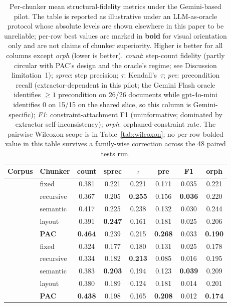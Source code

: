 \documentclass[make,article,submit,oneauthor,pdftex]{Definitions/mdpi}
\begin{document}
\begin{table}[ht]
\centering
\caption{Per-chunker mean structural-fidelity metrics under the
Gemini-based pilot. The table is reported as illustrative under an
LLM-as-oracle protocol whose absolute levels are shown elsewhere in
this paper to be unreliable; per-row best values are marked in
\textbf{bold} for visual orientation only and are not claims of
chunker superiority. Higher is better for all columns except
\emph{orph} (lower is better). \emph{count}: step-count fidelity
(partly circular with PAC's design and the oracle's regime; see
Discussion limitation~1); \emph{sprec}: step precision; $\tau$:
Kendall's~$\tau$; \emph{pre}: precondition recall (extractor-dependent
in this pilot; the Gemini Flash oracle identifies $\geq 1$ precondition
on 26/26 documents while gpt-4o-mini identifies $0$ on 15/15 on the
shared slice, so this column is Gemini-specific);
\emph{F1}: constraint-attachment F1 (uninformative; dominated by
extractor self-inconsistency);
\emph{orph}: orphaned-constraint rate. The pairwise Wilcoxon scope is
in Table~\ref{tab:wilcoxon}; no per-row bolded value in this table
survives a family-wise correction across the 48 paired tests run.}
\label{tab:headline}
\begin{tabular}{llcccccc}
\toprule
Corpus & Chunker & count & sprec & $\tau$ & pre & F1 & orph \\
\midrule
{}
 & fixed        & 0.381 & 0.221 & 0.221 & 0.171 & 0.035 & 0.221 \\
 & recursive    & 0.367 & 0.205 & \textbf{0.255} & 0.156 & \textbf{0.036} & 0.220 \\
 & semantic     & 0.417 & 0.225 & 0.238 & 0.132 & 0.030 & 0.244 \\
 & layout       & 0.391 & \textbf{0.247} & 0.161 & 0.181 & 0.025 & 0.206 \\
 & \textbf{PAC} & \textbf{0.464} & 0.239 & 0.215 & \textbf{0.268} & 0.033 & \textbf{0.190} \\
\midrule
{}
 & fixed        & 0.324 & 0.177 & 0.180 & 0.131 & 0.025 & 0.178 \\
 & recursive    & 0.334 & 0.182 & \textbf{0.213} & 0.085 & 0.016 & 0.195 \\
 & semantic     & 0.383 & \textbf{0.203} & 0.194 & 0.123 & \textbf{0.039} & 0.209 \\
 & layout       & 0.380 & 0.189 & 0.124 & 0.181 & 0.014 & 0.201 \\
 & \textbf{PAC} & \textbf{0.438} & 0.198 & 0.165 & \textbf{0.208} & 0.012 & \textbf{0.174} \\
\bottomrule
\end{tabular}
\end{table}
\end{document}
